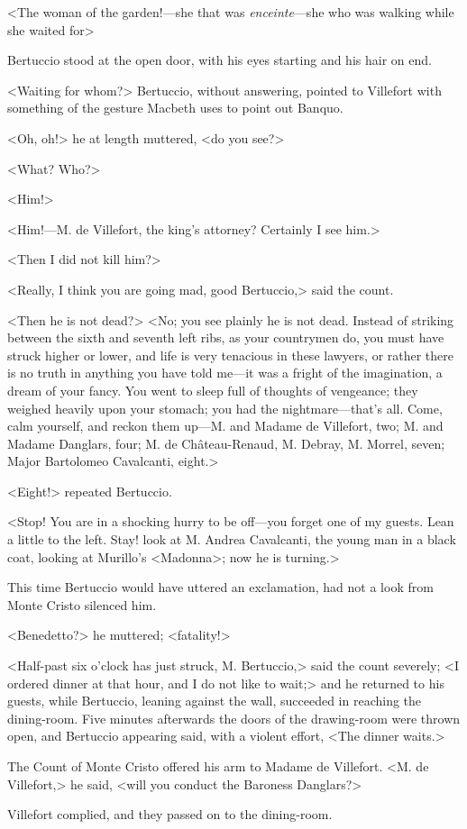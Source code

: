  <The woman of the garden!—she that was \textit{enceinte}—she who was walking while she waited for\longdash> 

 Bertuccio stood at the open door, with his eyes starting and his hair on end. 

 <Waiting for whom?> Bertuccio, without answering, pointed to Villefort with something of the gesture Macbeth uses to point out Banquo. 

 <Oh, oh!> he at length muttered, <do you see?> 

 <What? Who?> 

 <Him!> 

 <Him!—M. de Villefort, the king's attorney? Certainly I see him.> 

 <Then I did not kill him?> 

 <Really, I think you are going mad, good Bertuccio,> said the count. 

 <Then he is not dead?>  <No; you see plainly he is not dead. Instead of striking between the sixth and seventh left ribs, as your countrymen do, you must have struck higher or lower, and life is very tenacious in these lawyers, or rather there is no truth in anything you have told me—it was a fright of the imagination, a dream of your fancy. You went to sleep full of thoughts of vengeance; they weighed heavily upon your stomach; you had the nightmare—that's all. Come, calm yourself, and reckon them up—M. and Madame de Villefort, two; M. and Madame Danglars, four; M. de Château-Renaud, M. Debray, M. Morrel, seven; Major Bartolomeo Cavalcanti, eight.> 

 <Eight!> repeated Bertuccio. 

 <Stop! You are in a shocking hurry to be off—you forget one of my guests. Lean a little to the left. Stay! look at M. Andrea Cavalcanti, the young man in a black coat, looking at Murillo's <Madonna>; now he is turning.> 

 This time Bertuccio would have uttered an exclamation, had not a look from Monte Cristo silenced him. 

 <Benedetto?> he muttered; <fatality!> 

 <Half-past six o'clock has just struck, M. Bertuccio,> said the count severely; <I ordered dinner at that hour, and I do not like to wait;> and he returned to his guests, while Bertuccio, leaning against the wall, succeeded in reaching the dining-room. Five minutes afterwards the doors of the drawing-room were thrown open, and Bertuccio appearing said, with a violent effort, <The dinner waits.> 

 The Count of Monte Cristo offered his arm to Madame de Villefort. <M. de Villefort,> he said, <will you conduct the Baroness Danglars?> 

 Villefort complied, and they passed on to the dining-room. 